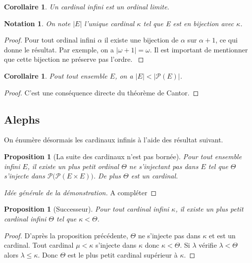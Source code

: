 \documentclass{article}
\theoremstyle{definition}
\theoremstyle{plain}
\newtheorem{proposition}[subsubsection]{Proposition}
\theoremstyle{plain}
\newtheorem{corollary}[subsubsection]{Corollaire}
\theoremstyle{plain}
\theoremstyle{plain}
\theoremstyle{plain}
\newtheorem*{notation}{Notation}
\begin{document}
\begin{corollary}
	Un cardinal infini est un ordinal limite.
\end{corollary}
\begin{notation}
	On note \( |E| \) l'unique cardinal \( \kappa \) tel que E est en bijection avec \( \kappa \).
\end{notation}

\begin{proof}
	Pour tout ordinal infini \( \alpha \) il existe une bijection de \( \alpha \) sur \( \alpha + 1 \), ce qui donne le résultat. Par exemple, on a \( |\omega + 1| = \omega \). Il est important de mentionner que cette bijection ne préserve pas l'ordre. \cite{gowers2010ordinals}
\end{proof}

\begin{corollary}
	Pout tout ensemble \( E \), on a \( |E| < |\mathcal{P}(E)| \).
\end{corollary}
\begin{proof}
	C'est une conséquence directe du théorème de Cantor.
\end{proof}

\subsection{Alephs}

\par On énumère désormais les cardinaux infinis à l'aide des résultat suivant.

\begin{proposition}[La suite des cardinaux n'est pas bornée]
	Pour tout ensemble infini \( E \), il existe un plus petit ordinal \( \Theta \) ne s'injectant pas dans \( E \) tel que \( \Theta \) s'injecte dans \( \mathcal{P(\mathcal{P}}(E \times E))\). De plus \( \Theta \) est un cardinal.
\end{proposition}
\begin{proof}[Idée générale de la démonstration]
	A compléter
\end{proof}

\begin{proposition}[Successeur]
	Pour tout cardinal infini \( \kappa \), il existe un plus petit cardinal infini \( \Theta \) tel que \( \kappa < \Theta \).
\end{proposition}
\begin{proof}
	D'après la proposition précédente, \( \Theta \) ne s'injecte pas dans \( \kappa \) et est un cardinal. Tout cardinal \( \mu < \kappa \) s'injecte dans \( \kappa \) donc \( \kappa < \Theta \). Si \( \lambda \) vérifie \( \lambda <  \Theta \) alors \( \lambda \le \kappa \). Donc \( \Theta \) est le plus petit cardinal supérieur à \( \kappa \).  
\end{proof}
\end{document}
